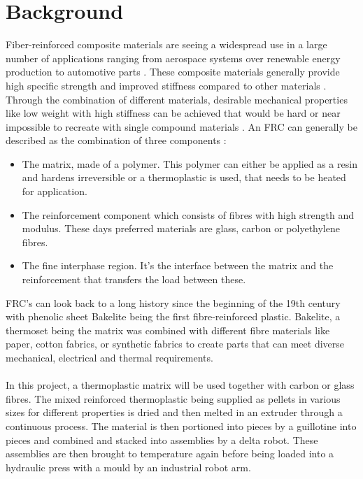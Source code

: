 
\chapter{Background}

Fiber-reinforced composite materials are seeing a widespread use in a large number of applications ranging from aerospace systems over renewable energy production to automotive parts \cite{park2011interface} \cite{HighPerformanceTextiles}. 
These composite materials generally provide high specific strength and improved stiffness compared to other materials \cite{GeneralizedContinuumMechanics}. 
Through the combination of different materials, desirable mechanical properties like low weight with high stiffness can be achieved that would be hard or near impossible to recreate with single compound materials \cite{AdvancesDamageMechanics}. 
An FRC can generally be described as the combination of three components \cite{AdvancedDentalBiomaterials}: \\
\begin{itemize}
	\item The matrix, made of a polymer. 
	This polymer can either be applied as a resin and hardens irreversible or a thermoplastic is used, that needs to be heated for application.
	\item The reinforcement component which consists of fibres with high strength and modulus. 
	These days preferred materials are glass, carbon or polyethylene fibres.
	\item The fine interphase region. 
	It's the interface between the matrix and the reinforcement that transfers the load between these.	
\end{itemize}
%
FRC's can look back to a long history since the beginning of the 19th century with phenolic sheet Bakelite being the first fibre-reinforced plastic. 
Bakelite, a thermoset being the matrix was combined with different fibre materials like paper, cotton fabrics, or synthetic fabrics to create parts that can meet diverse mechanical, electrical and thermal requirements.
\cite{BakelitePhenolics}\\
\\
In this project, a thermoplastic matrix will be used together with carbon or glass fibres. 
The mixed reinforced thermoplastic being supplied as pellets in various sizes for different properties is dried and then melted in an extruder through a continuous process. 
The material is then portioned into pieces by a guillotine into pieces and combined and stacked into assemblies by a delta robot. 
These assemblies are then brought to temperature again before being loaded into a hydraulic press with a mould by an industrial robot arm.
\cite{SystemRequirements}







